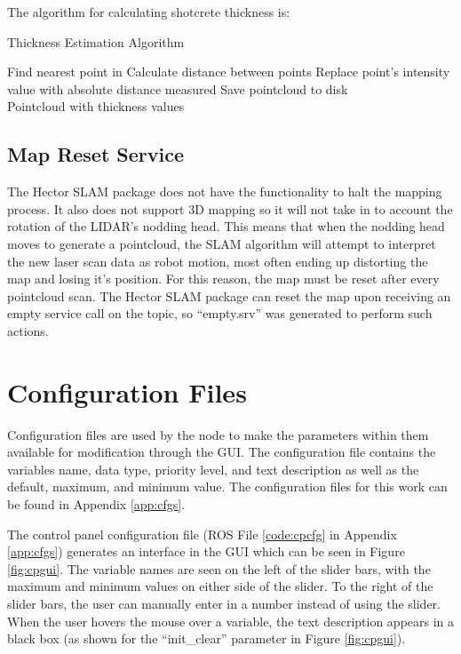 The algorithm for calculating shotcrete thickness is:

\begin{algorithm}[H]
\caption{Thickness Estimation Algorithm}
\label{alg:thick}
\begin{algorithmic}[1]
\begin{raggedright}
\State Find nearest point in 
\State Calculate distance between points
\State Replace point's intensity value with absolute distance measured
\EndFor
\State Save pointcloud to disk
\EndFunction\\
\Return Pointcloud with thickness values
\end{raggedright}
\end{algorithmic}
\end{algorithm}

\subsection{Map Reset Service}
The Hector SLAM package does not have the functionality to halt the mapping process. It also does not support 3D mapping so it will not take in to account the rotation of the LIDAR's nodding head. This means that when the nodding head moves to generate a pointcloud, the SLAM algorithm will attempt to interpret the new laser scan data as robot motion, most often ending up distorting the map and losing it's position. For this reason, the map must be reset after every pointcloud scan. The Hector SLAM package can reset the map upon receiving an empty service call on the  topic, so ``empty.srv'' was generated to perform such actions.\\

\section{Configuration Files}
Configuration files are used by the  node to make the parameters within them available for modification through the  GUI. The configuration file contains the variables name, data type, priority level, and text description as well as the default, maximum, and minimum value. The configuration files for this work can be found in Appendix \ref{app:cfgs}.

The control panel configuration file (ROS File \ref{code:cpcfg} in Appendix \ref{app:cfgs}) generates an interface in the  GUI which can be seen in Figure \ref{fig:cpgui}. The variable names are seen on the left of the slider bars, with the maximum and minimum values on either side of the slider. To the right of the slider bars, the user can manually enter in a number instead of using the slider. When the user hovers the mouse over a variable, the text description appears in a black box (as shown for the ``init\_clear'' parameter in Figure \ref{fig:cpgui}).

